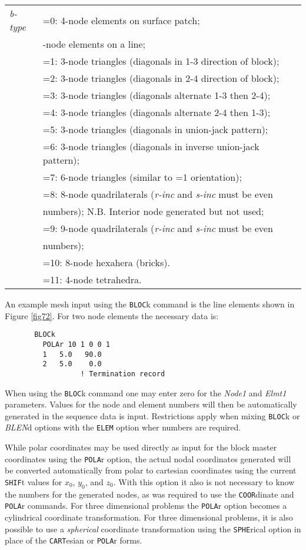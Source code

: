 \begin{center}
\begin{tabular}{l l}
\it b-type &=0: 4-node elements on surface patch; \\
           &\qquad 2-node elements on a line; \\
           &=1: 3-node triangles (diagonals in 1-3 direction of block); \\
           &=2: 3-node triangles (diagonals in 2-4 direction of block); \\
           &=3: 3-node triangles (diagonals alternate 1-3 then 2-4); \\
           &=4: 3-node triangles (diagonals alternate 2-4 then 1-3); \\
           &=5: 3-node triangles (diagonals in union-jack pattern); \\
           &=6: 3-node triangles (diagonals in inverse union-jack pattern); \\
           &=7: 6-node triangles (similar to =1 orientation); \\
           &=8: 8-node quadrilaterals ({\it r-inc} and {\it s-inc} must be even \\
           &\qquad numbers);  N.B. Interior node generated but not used; \\
           &=9: 9-node quadrilaterals ({\it r-inc} and {\it s-inc} must be even \\
           &\qquad numbers); \\
           &=10: 8-node hexahera (bricks).\\
           &=11: 4-node tetrahedra.\\
\end{tabular}
\end{center}

An example mesh input using the {\tt BLOC}k command is the line
elements shown in Figure \ref{fig72}.
For two node elements the necessary data is:
\begin{verbatim}
       BLOCk
         POLAr 10 1 0 0 1
         1   5.0   90.0
         2   5.0    0.0
                  ! Termination record
\end{verbatim}
When using the {\tt BLOC}k command one may enter zero for the
{\it Node1} and {\it Elmt1} parameters.
Values for the node and element numbers will then be automatically generated
in the sequence data is input.  Restrictions apply when mixing {\tt BLOC}k
or {\it BLEN}d options with the {\tt ELEM} option wher numbers are required.

While polar coordinates
may be used directly as input for the block master coordinates using the
{\tt POLA}r option,
the actual nodal coordinates generated will be converted automatically
from polar to cartesian coordinates using the current {\tt SHIF}t values
for $x_0$, $y_0$, and $z_0$.
With this option it also is not necessary to know the numbers for the
generated nodes, as was required to use the {\tt COOR}\-dinate and
{\tt POLA}r commands.
For three dimensional problems the {\tt POLA}r option becomes a cylindrical
coordinate transformation.
For three dimensional problems, it is also possible to use a {\it spherical}
coordinate transformation using the {\tt SPHE}rical option in place of the
{\tt CART}esian or {\tt POLA}r forms.

